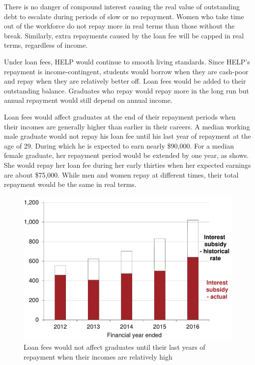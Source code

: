 \documentclass[embargoed]{grattan}
\begin{document}
There is no danger of compound interest causing the real value of outstanding debt to escalate during periods of slow or no repayment.
Women who take time out of the workforce do not repay more in real terms than those without the break.
Similarly, extra repayments caused by the loan fee will be capped in real terms, regardless of income.

Under loan fees, \gls{HELP} would continue to smooth living standards.
Since \gls{HELP}'s repayment is income-contingent, students would borrow when they are cash-poor and repay when they are relatively better off.
Loan fees would be added to their outstanding balance.
Graduates who repay would repay more in the long run but annual repayment would still depend on annual income.

Loan fees would affect graduates at the end of their repayment periods when their incomes are generally higher than earlier in their careers.
A median working male graduate would not repay his loan fee until his last year of repayment at the age of 29.
During which he is expected to earn nearly \$90,000.
For a median female graduate, her repayment period would be extended by one year, as  shows.
She would repay her loan fee during her early thirties when her expected earnings are about \$75,000.
While men and women repay at different times, their total repayment would be the same in real terms.

\begin{figure}
\caption{Loan fees would not affect graduates until their last years of repayment when their incomes are relatively high}\label{fig:fig21-loan-fees-would-not-affect-grads-until-their-last-years-of-repayment-when-their-incomes-are-relatively-high}


\includegraphics[page=21]{atlas/Chartpack.pdf}

\end{figure}
\end{document}
